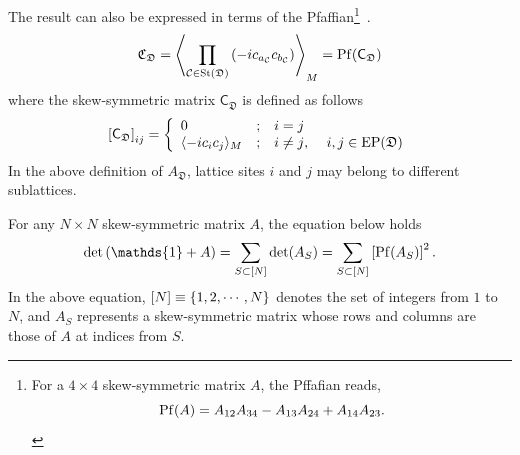 The result can also be expressed in terms of the Pfaffian\footnote{For a $4\times 4$ skew-symmetric matrix $A$, the Pffafian reads,
\[
\mathrm{Pf}(A) = A_{12}A_{34} - A_{13}A_{24} + A_{14}A_{23}.
\]
}~\cite{Wang-Yang-Zhou-Chen_2025}.
\begin{equation}\label{eq:pfaffian-def}
    \mathfrak{C}_\mathfrak{D}
    =
    \left\langle 
    \prod_{\mathcal{C} \in \mathrm{St}(\mathfrak{D})} 
        \left( -i c_{a_{\mathcal{C}}}c_{b_{\mathcal{C}}}  \right)
     \right\rangle_M  
    =
    \mathrm{Pf}(\mathsf{C}_\mathfrak{D})
\end{equation}
where the skew-symmetric matrix $\mathsf{C}_\mathfrak{D}$ is defined as follows
\begin{equation}\label{eq:corr-mat-def}
    \left[ \mathsf{C}_\mathfrak{D} \right]_{ij}
    =
    \left\{
    \begin{array}{lll}
        0 & ; & i=j \\
        \langle -ic_ic_j \rangle_M & ; & \text{$i\neq j$, \quad $i,j\in \mathrm{EP}(\mathfrak{D})$}
    \end{array}
    \right.
\end{equation}
In the above definition of $A_\mathfrak{D}$, lattice sites $i$ and $j$ may belong to different sublattices.
\begin{theorem}\label{thm:det-pfaffian-square}
    For any $N\times N$ skew-symmetric matrix $A$, the equation below holds~\cite{Wang-Yang-Zhou-Chen_2025}
    \[
    \det\lr{\mathds{1} + A} = 
    \sum_{S \subset [N]} \det(A_S)
    =
    \sum_{S \subset [N]} \lrm{\mrm{Pf}(A_S)}^2 .
    \]
    In the above equation, $[N] \equiv \left\{ 1,2,\cdots,N \right\}$ denotes the set of integers from $1$ to $N$, and $A_{S}$ represents a skew-symmetric matrix whose rows and columns are those of $A$ at indices from $S$. 
\end{theorem}
